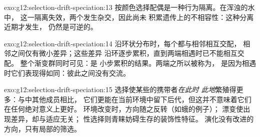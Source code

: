\begin{solution}{exo:g12:selection-drift-speciation:13}
按颜色选择配偶是一种行为隔离。在浑浊的水中，
这一隔离失效，两个发生杂交，因此尚未
积累遗传上的不相容性：这种分离近期才发生，
仍然是可逆的。
\end{solution}

\begin{solution}{exo:g12:selection-drift-speciation:14}
沿环状分布时，每个都与相邻相互交配，
相邻之间仅有微小差异；这些差异
沿环逐步累积，直到两端相遇时已不能相互交配。
整个渐变群同时可见：是
小步累积的结果。两端之所以被称为，
是因为相遇时它们表现得如同：彼此之间没有交流。
\end{solution}

\begin{solution}{exo:g12:selection-drift-speciation:15}
选择使某些的携带者\emph{在此时
此地}繁殖得更多：与中其他成员相比，
它们更能在当前环境中留下后代，但这并不意味着它们在任何绝对意义上更好。
环境改变时，方向随之反转（如蛾的例子）；
漂变使出现差异，却与适应无关；
性选择则青睐妨碍生存的装饰性特征。
演化没有改进的方向，只有局部的筛选。
\end{solution}

